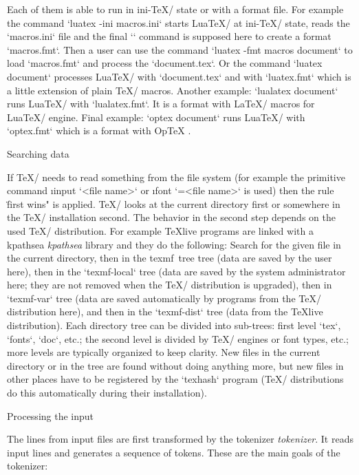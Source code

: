 Each of them is able to run in ini-\TeX/ state or with a format file. For
example the command `luatex -ini macros.ini` starts Lua\TeX/ at ini-\TeX/ state,
reads the `macros.ini` file and the final `\dump` command is supposed here to create
a format `macros.fmt`. Then a user can use the command `luatex -fmt macros document` to
load `macros.fmt` and process the `document.tex`.
Or the command `luatex document` processes Lua\TeX/ with `document.tex` and 
with `luatex.fmt` which is a little extension of plain \TeX/ macros. Another example:
`lualatex document` runs Lua\TeX/ with `lualatex.fmt`. It is a format with
\LaTeX/ macros for Lua\TeX/ engine. Final example: 
`optex document` runs Lua\TeX/ with `optex.fmt` which is
a format with \ii OpTeX .

\sec Searching data

If \TeX/ needs to read something from the file system (for example the
primitive command \i input `<file name>` or 
\i font `=<file name>` is used) 
then the rule
\"first wins" is applied. \TeX/ looks at the current directory first or
somewhere in the \TeX/ installation second. The behavior in the second step
depends on the used \TeX/ distribution. For example 
\ii TeXlive  programs are
linked with a \ii kpathsea {\em kpathsea} library and they do the following: Search for the given
file in the current directory, then in the \ii texmf~tree  tree (data are saved by
the user here), then in the `texmf-local` tree (data are saved by the system administrator
here; they are not removed when the \TeX/ distribution is upgraded), 
then in `texmf-var` tree (data are saved automatically by programs from the
\TeX/ distribution here), and then in the `texmf-dist` tree (data from the \TeX live
distribution). Each directory tree can be divided into sub-trees: first level
`tex`, `fonts`, `doc`, etc.; the second level is divided by \TeX/ engines or font types, etc.;
more levels are typically organized to keep clarity.
New files in the current directory or in the  tree are found without 
doing anything more, but new files in other places have to be registered by the `texhash`
program (\TeX/ distributions do this automatically during their installation).


\sec Processing the input

The lines from input files are first transformed by the \ii tokenizer {\em tokenizer}.
It reads input lines and generates a sequence of tokens. These are the
main goals of the tokenizer:

